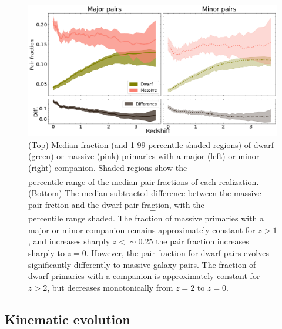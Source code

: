 \documentclass[twocolumn]{aastex631}
\begin{document}
\label{sec:results}
\begin{figure}[htb]
  \centering
  \includegraphics[width=\textwidth]{pairratio.png}
  \caption{(Top) Median fraction (and 1-99 percentile shaded regions) of dwarf (green) or massive (pink) primaries with a major (left) or minor (right) companion. Shaded regions show the $$-$$ percentile range of the median pair fractions of each realization. 
  (Bottom) The median subtracted difference between the massive pair frction and the dwarf pair fraction, with the $$-$$ percentile range shaded. 
  The fraction of massive primaries with a major or minor companion remains approximately constant for $z>1$, and increases sharply  $z<\sim0.25$ the pair fraction increases sharply to $z=0$. However, the pair fraction for dwarf pairs evolves significantly differently to massive galaxy pairs. The fraction of dwarf primaries with a companion is approximately constant for $z>2$, but decreases monotonically from $z=2$ to $z=0$.  
    }
  \label{fig:pairratio}
\end{figure}

\subsection{Kinematic evolution}
\end{document}

